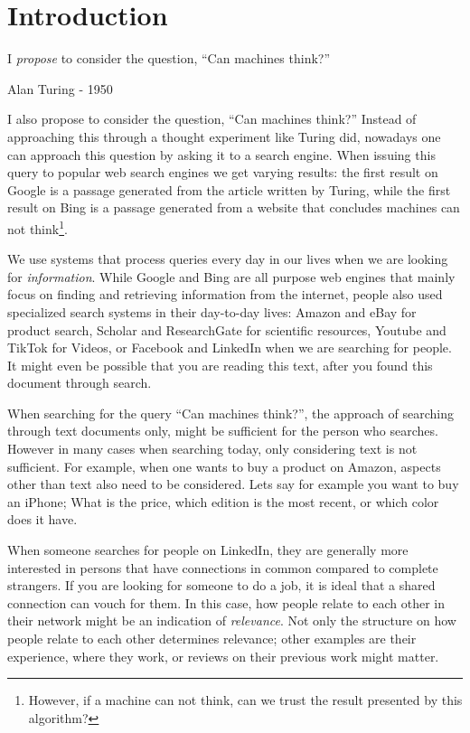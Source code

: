 \chapter{Introduction}
\epigraph{I \textit{propose} to consider the question, ``Can machines think?''}{Alan Turing - 1950}

I also propose to consider the question, ``Can machines think?'' Instead of approaching this through a thought experiment like Turing did, nowadays one can approach this question by asking it to a search engine. When issuing this query to popular web search engines we get varying results: the first result on Google is a passage generated from the article written by Turing, while the first result on Bing is a passage generated from a website that concludes machines can not think\footnote{However, if a machine can not think, can we trust the result presented by this algorithm?}.

We use systems that process queries every day in our lives when we are looking for \textit{information}. While Google and Bing are all purpose web engines that mainly focus on finding and retrieving information from the internet, people also used specialized search systems in their day-to-day lives: Amazon and eBay for product search, Scholar and ResearchGate for scientific resources, Youtube and TikTok for Videos, or Facebook and LinkedIn when we are searching for people. It might even be possible that you are reading this text, after you found this document through search. 

When searching for the query ``Can machines think?'', the approach of searching through text documents only, might be sufficient for the person who searches. However in many cases when searching today, only considering text is not sufficient. For example, when one wants to buy a product on Amazon, aspects other than text also need to be considered. Lets say for example you want to buy an iPhone; What is the price, which edition is the most recent, or which color does it have.

When someone searches for people on LinkedIn, they are generally more interested in persons that have connections in common compared to complete strangers. If you are looking for someone to do a job, it is ideal that a shared connection can vouch for them. In this case, how people relate to each other in their network might be an indication of \textit{relevance}. Not only the structure on how people relate to each other determines relevance; other examples are their experience, where they work, or reviews on their previous work might matter.

